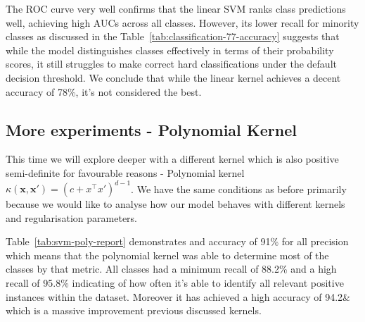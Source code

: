 \documentclass[10pt,twocolumn]{article}
\begin{document}
The ROC curve very well confirms that the linear SVM ranks class predictions well, achieving high AUCs across all classes. However, its lower recall for minority classes as discussed in the Table~\ref{tab:classification-77-accuracy} suggests that while the model distinguishes classes effectively in terms of their probability scores, it still struggles to make correct hard classifications under the default decision threshold.
We conclude that while the linear kernel achieves a decent accuracy of 78\%, it's not considered the best.

\subsection{More experiments - Polynomial Kernel}

This time we will explore deeper with a different kernel which is also positive semi-definite for favourable reasons - Polynomial kernel $\kappa(\mathbf{x}, \mathbf{x}') = (c + \mathbf{}{x}^\top \mathbf{}{x}')^{d - 1}$. We have the same conditions as before primarily because we would like to analyse how our model behaves with different kernels and regularisation parameters.

\begin{table}[H]
\centering
\caption{Classification Report (Polynomial kernel)}
\label{tab:svm-poly-report}
\end{table}
Table~\ref{tab:svm-poly-report} demonstrates and accuracy of 91\% for all precision which means that the polynomial kernel was able to determine most of the classes by that metric. All classes had a minimum recall of 88.2\% and a high recall of 95.8\% indicating of how often it's able to identify all relevant positive instances within the dataset. Moreover it has achieved a high accuracy of 94.2\& which is a massive improvement previous discussed kernels. 
\end{document}
